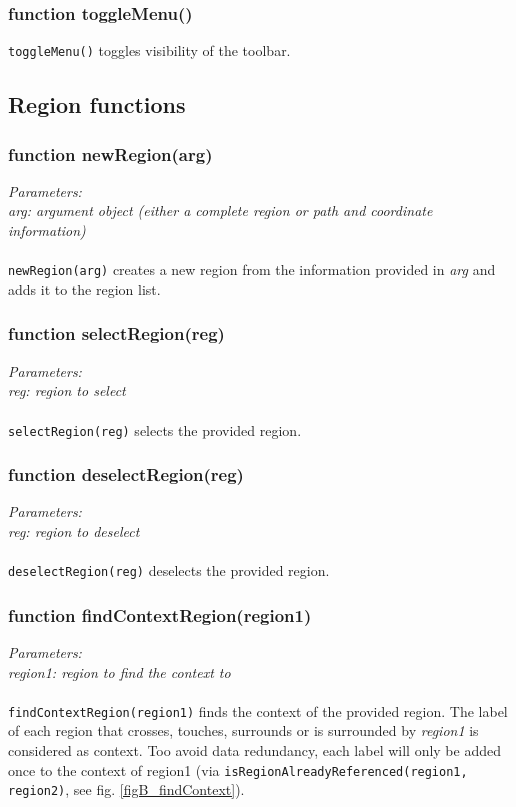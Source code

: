 \subsubsection{function toggleMenu()}
\texttt{toggleMenu()} toggles visibility of the toolbar.


\subsection{Region functions}

\subsubsection{function newRegion(arg)}
\emph{Parameters:\\
	arg: argument object (either a complete region or path and coordinate information)\\ \\
}
\texttt{newRegion(arg)} creates a new region from the information provided in \emph{arg} and adds it to the region list.


\subsubsection{function selectRegion(reg)}
\emph{Parameters:\\
	reg: region to select\\ \\
}
\texttt{selectRegion(reg)} selects the provided region.


\subsubsection{function deselectRegion(reg)}
\emph{Parameters:\\
	reg: region to deselect\\ \\
}
\texttt{deselectRegion(reg)} deselects the provided region.


\subsubsection{function findContextRegion(region1)}
\emph{Parameters:\\
	region1: region to find the context to\\ \\
}
\texttt{findContextRegion(region1)} finds the context of the provided region. The label of each region that crosses, touches, surrounds or is surrounded by \emph{region1} is considered as context. Too avoid data redundancy, each label will only be added once to the context of region1 (via \texttt{isRegionAlreadyReferenced(region1, region2)}, see fig. \ref{figB_findContext}).

